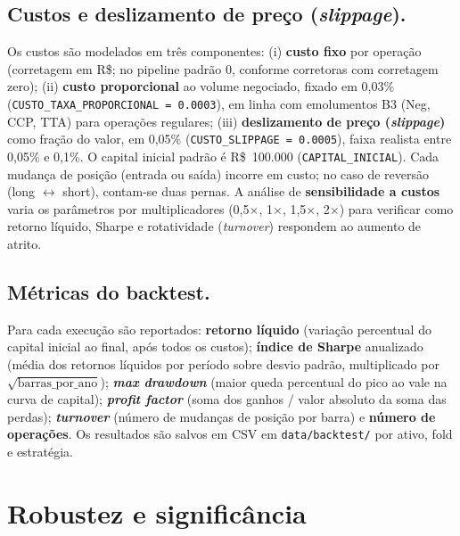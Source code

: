 \subsection{Custos e deslizamento de preço (\textit{slippage}).} Os custos são modelados em três componentes: (i) \textbf{custo fixo} por operação (corretagem em R\$; no pipeline padrão 0, conforme corretoras com corretagem zero); (ii) \textbf{custo proporcional} ao volume negociado, fixado em 0,03\% (\texttt{CUSTO\_TAXA\_PROPORCIONAL = 0.0003}), em linha com emolumentos B3 (Neg, CCP, TTA) para operações regulares; (iii) \textbf{deslizamento de preço (\textit{slippage})} como fração do valor, em 0,05\% (\texttt{CUSTO\_SLIPPAGE = 0.0005}), faixa realista entre 0,05\% e 0,1\%. O capital inicial padrão é R\$~100.000 (\texttt{CAPITAL\_INICIAL}). Cada mudança de posição (entrada ou saída) incorre em custo; no caso de reversão (long $\leftrightarrow$ short), contam-se duas pernas. A análise de \textbf{sensibilidade a custos} varia os parâmetros por multiplicadores (0,5$\times$, 1$\times$, 1,5$\times$, 2$\times$) para verificar como retorno líquido, Sharpe e rotatividade (\textit{turnover}) respondem ao aumento de atrito.

\subsection{Métricas do backtest.} Para cada execução são reportados: \textbf{retorno líquido} (variação percentual do capital inicial ao final, após todos os custos); \textbf{índice de Sharpe} anualizado (média dos retornos líquidos por período sobre desvio padrão, multiplicado por $\sqrt{\text{barras\_por\_ano}}$); \textbf{\textit{max drawdown}} (maior queda percentual do pico ao vale na curva de capital); \textbf{\textit{profit factor}} (soma dos ganhos / valor absoluto da soma das perdas); \textbf{\textit{turnover}} (número de mudanças de posição por barra) e \textbf{número de operações}. Os resultados são salvos em CSV em \texttt{data/backtest/} por ativo, fold e estratégia.

\section{Robustez e significância}
\label{sec:robustez-significancia}

